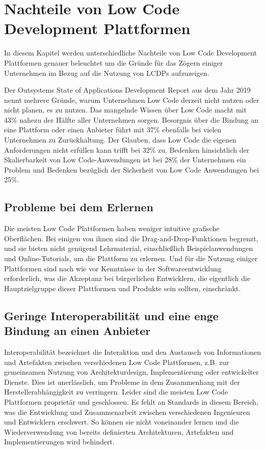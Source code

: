 \documentclass[12pt]{article} %
\begin{document}
	\section{Nachteile von Low Code Development Plattformen} \label{Nachteile}
	In diesem Kapitel werden unterschiedliche Nachteile von Low Code Development Plattformen genauer beleuchtet um die Gründe für das Zögern einiger Unternehmen im Bezug auf die Nutzung von LCDPs aufzuzeigen. \newline
	
	Der Outsystems State of Applications Development Report aus dem Jahr 2019 nennt mehrere Gründe, warum Unternehmen Low Code derzeit nicht nutzen oder nicht planen, es zu nutzen. Das mangelnde Wissen über Low Code macht mit 43\% nahezu der Hälfte aller Unternehmen sorgen. Besorgnis über die Bindung an eine Plattform oder einen Anbieter führt mit 37\% ebenfalls bei vielen Unternehmen zu Zurückhaltung. Der Glauben, dass Low Code die eigenen Anforderungen nicht erfüllen kann trifft bei 32\% zu. Bedenken hinsichtlich der Skalierbarkeit von Low Code-Anwendungen ist bei 28\% der Unternehmen ein Problem und Bedenken bezüglich der Sicherheit von Low Code Anwendungen bei 25\%. \autocite{KevinShuler.2023}
			
	\subsection{Probleme bei dem Erlernen}
	Die meisten Low Code Plattformen haben weniger intuitive grafische Oberflächen. Bei einigen von ihnen sind die Drag-and-Drop-Funktionen begrenzt, und sie bieten nicht genügend Lehrmaterial, einschließlich Beispielanwendungen und Online-Tutorials, um die Plattform zu erlernen. 
	Und für die Nutzung einiger Plattformen sind nach wie vor Kenntnisse in der Softwareentwicklung erforderlich, was die Akzeptanz bei bürgerlichen Entwicklern, die eigentlich die Hauptzielgruppe dieser Plattformen und Produkte sein sollten, einschränkt. \autocite{Alamin.2023}
	
	\subsection{Geringe Interoperabilität und eine enge Bindung an einen Anbieter}
	Interoperabilität bezeichnet die Interaktion und den Austausch von Informationen und Artefakten zwischen verschiedenen Low Code Plattformen, z.B. zur gemeinsamen Nutzung von Architekturdesign, Implementierung oder entwickelter Dienste. Dies ist unerlässlich, um Probleme in dem Zusammenhang mit der Herstellerabhängigkeit zu verringern. Leider sind die meisten Low Code Plattformen proprietär und geschlossen. Es fehlt an Standards in diesem Bereich, was die Entwicklung und Zusammenarbeit zwischen verschiedenen Ingenieuren und Entwicklern erschwert. So können sie nicht voneinander lernen und die Wiederverwendung von bereits definierten Architekturen, Artefakten und Implementierungen wird behindert. \autocite{Alamin.2023}
	
\end{document}
